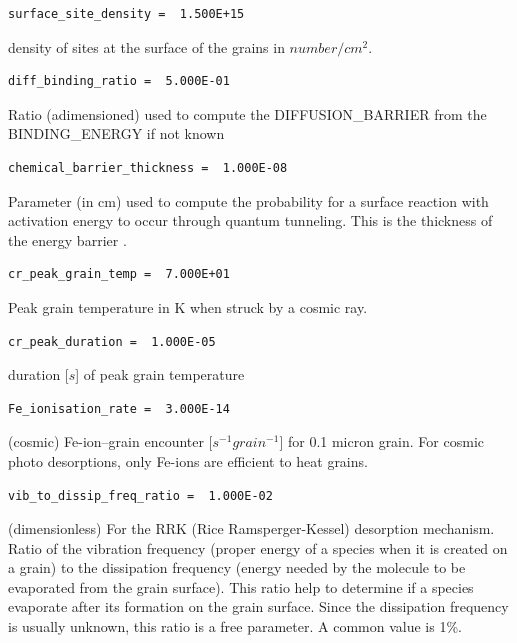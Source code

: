 \documentclass[english,a4paper,twoside]{article}
\begin{document}
\begin{verbatim}
surface_site_density =  1.500E+15
\end{verbatim}
density of sites at the surface of the grains in $\unit{number/cm^{2}}$.

\begin{verbatim}
diff_binding_ratio =  5.000E-01
\end{verbatim}
Ratio (adimensioned) used to compute the DIFFUSION\_BARRIER from the BINDING\_ENERGY if not known

\begin{verbatim}
chemical_barrier_thickness =  1.000E-08
\end{verbatim}
Parameter (in cm) used to compute the probability for a surface reaction with activation energy to occur through quantum tunneling. This is the thickness of the energy barrier \citep[See equation 6]{1992ApJS...82..167H}.

\begin{verbatim}
cr_peak_grain_temp =  7.000E+01
\end{verbatim}
Peak grain temperature in K when struck by a cosmic ray.

\begin{verbatim}
cr_peak_duration =  1.000E-05
\end{verbatim}
duration [$\unit{s}$] of peak grain temperature

\begin{verbatim}
Fe_ionisation_rate =  3.000E-14
\end{verbatim}
(cosmic) Fe-ion--grain encounter [$\unit{s^{-1} grain^{-1}}$] for 0.1 micron grain. For cosmic photo desorptions, only Fe-ions are efficient to heat grains. 

\begin{verbatim}
vib_to_dissip_freq_ratio =  1.000E-02
\end{verbatim}
(dimensionless) For the RRK (Rice Ramsperger-Kessel) desorption mechanism. Ratio of the vibration frequency (proper energy of a species when it is created on a grain) to the dissipation frequency (energy needed by the molecule to be evaporated from the grain surface). This ratio help to determine if a species evaporate after its formation on the grain surface. Since the dissipation frequency is usually unknown, this ratio is a free parameter. A common value is 1\%.
\end{document}
